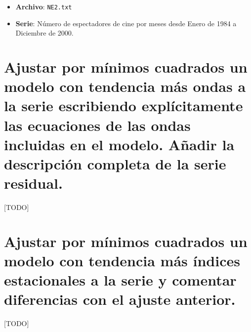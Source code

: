 \documentclass[a4paper, spanish]{article}
\begin{document}
  \maketitle

  \begin{itemize}
    \item \textbf{Archivo}: \texttt{NE2.txt}
    \item \textbf{Serie}: Número de espectadores de cine por meses desde Enero de 1984 a Diciembre de 2000.
  \end{itemize}

  \section{Ajustar por mínimos cuadrados un modelo con tendencia más ondas a la serie escribiendo explícitamente las ecuaciones de las ondas incluidas en el modelo. Añadir la descripción completa de la serie residual.}

    \paragraph{}
    [TODO]

  \section{Ajustar por mínimos cuadrados un modelo con tendencia más índices estacionales a la serie y comentar diferencias con el ajuste anterior.}

    \paragraph{}
    [TODO]
\end{document}

